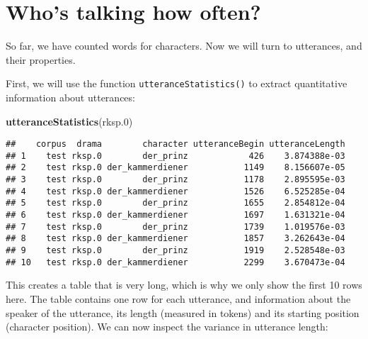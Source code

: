 \documentclass[]{book}
\newenvironment{Shaded}{\begin{snugshade}}{\end{snugshade}}
\newcommand{\FloatTok}[1]{\textcolor[rgb]{0.00,0.00,0.81}{#1}}
\newcommand{\KeywordTok}[1]{\textcolor[rgb]{0.13,0.29,0.53}{\textbf{#1}}}
\newcommand{\NormalTok}[1]{#1}
\begin{document}
\hypertarget{who-how-often}{%
\chapter{Who's talking how often?}\label{who-how-often}}

So far, we have counted words for characters. Now we will turn to utterances, and their properties.

First, we will use the function \texttt{utteranceStatistics()} to extract quantitative information about utterances:

\begin{Shaded}
\begin{Highlighting}[]
\KeywordTok{utteranceStatistics}\NormalTok{(rksp}\FloatTok{.0}\NormalTok{)}
\end{Highlighting}
\end{Shaded}

\begin{verbatim}
##    corpus  drama        character utteranceBegin utteranceLength
## 1    test rksp.0        der_prinz            426    3.874388e-03
## 2    test rksp.0 der_kammerdiener           1149    8.156607e-05
## 3    test rksp.0        der_prinz           1178    2.895595e-03
## 4    test rksp.0 der_kammerdiener           1526    6.525285e-04
## 5    test rksp.0        der_prinz           1655    2.854812e-04
## 6    test rksp.0 der_kammerdiener           1697    1.631321e-04
## 7    test rksp.0        der_prinz           1739    1.019576e-03
## 8    test rksp.0 der_kammerdiener           1857    3.262643e-04
## 9    test rksp.0        der_prinz           1919    2.528548e-03
## 10   test rksp.0 der_kammerdiener           2299    3.670473e-04
\end{verbatim}

This creates a table that is very long, which is why we only show the first 10 rows here. The table contains one row for each utterance, and information about the speaker of the utterance, its length (measured in tokens) and its starting position (character position). We can now inspect the variance in utterance length:
\end{document}
